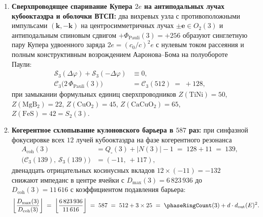 \begin{theorem}
\begin{enumerate}[label=\textbf{\arabic*.},noitemsep]
\begin{equation}
    \Phi_{\mathrm{ring}}(N_\pi) \;\equiv\; Q_\square(3)\,N_\pi + \Phi_{\mathrm{Pauli}}(3) \;\equiv\; 128\,N_\pi + 256 \pmod{512},
  \end{equation}
  что даёт ароматический связывающий максимум $\mathcal{C}_3(0) = +128$ при $N_\pi = 4n + 2$ и антиароматический мёбиусовский полюс $\mathcal{C}_3(256) = -128$ при $N_\pi = 4n$ (правила дисротаторного и конротаторного замыкания Вудворда--Хоффмана).
\item \textbf{Сверхпроводящее спаривание Купера $2e$ на антиподальных лучах кубооктаэдра и оболочки ВТСП:}
  два вихревых узла с противоположными импульсами $(\mathbf{k}, -\mathbf{k})$ на центросимметричных лучах $\pm\mathbf{e} \in O_2(3)$ и антиподальным спиновым сдвигом $+\Phi_{\mathrm{Pauli}}(3) = +256$ образуют синглетную пару Купера удвоенного заряда $2e = (c_0/c)^2 e$ с нулевым током рассеяния и полным конструктивным возрождением Ааронова--Бома на полуобороте Паули:
  \begin{align}
    \mathcal{S}_3(\Delta\varphi) + \mathcal{S}_3(-\Delta\varphi) &\equiv 0, \label{eq:mono-cooper-odd-cancel} \\
    \mathcal{C}_3\bigl(2\,\Phi_{\mathrm{Pauli}}(3)\bigr) &= \mathcal{C}_3(512) \;=\; +128, \label{eq:mono-cooper-revival}
  \end{align}
  при замыкании формульных единиц сверхпроводников $Z(\mathrm{TiNi}) = 50$, $Z(\mathrm{MgB_2}) = 22$, $Z(\mathrm{CuO_2}) = 45$, $Z(\mathrm{CaCuO_2}) = 65$, $Z(\mathrm{FeS}) = 42 = S_2(3)$.
\item \textbf{Когерентное схлопывание кулоновского барьера в $587$ раз:}
  при синфазной фокусировке всех $12$ лучей кубооктаэдра на фазе когерентного резонанса
  \begin{align}
    A_{\mathrm{coh}}(3) &= Q_\square(3) + |N(3)| - 1 \;=\; 128 + 11 \;=\; 139, \label{eq:mono-acoh-139} \\
    \bigl(\mathcal{C}_3(139),\ \mathcal{S}_3(139)\bigr) &= (-11,\ +117), \label{eq:mono-acoh-cs}
  \end{align}
  двенадцать отрицательных косинусных вкладов $12 \times (-11) = -132$ снижают импеданс в центре ячейки с $D_{\max}(3) = 6\,823\,936$ до $D_{\mathrm{coh}}(3) = 11\,616$ с коэффициентом подавления барьера:
  \begin{equation}
    \label{eq:mono-587-collapse}
    \left\lfloor \frac{D_{\max}(3)}{D_{\mathrm{coh}}(3)} \right\rfloor \;=\; \left\lfloor \frac{6\,823\,936}{11\,616} \right\rfloor \;=\; 587 \;=\; 512 + 3 \times 25 \;=\; \phaseRingCount(3) + d\cdot d_{\mathrm{out}}(E)^2.
  \end{equation}
\end{enumerate}
\end{theorem}

